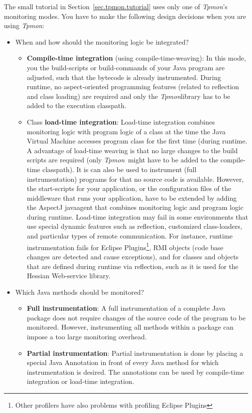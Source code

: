 \documentclass[a4paper,12pt]{scrartcl}
\newcommand{\tpmon}{\textit{Tpmon}}
\begin{document}
The small tutorial in Section~\ref{sec.tpmon.tutorial} uses only one of \tpmon's monitoring modes. You have to make the following design decisions when you are using \tpmon:
\begin{itemize}
 \item When and how should the monitoring logic be integrated?
\begin{itemize}
 \item \textbf{Compile-time integration} (using compile-time-weaving): In this mode, you the build-scripts or build-commands of your Java program are adjusted, such that the bytecode is already instrumented. During runtime, no aspect-oriented programming features (related to reflection and class loading) are required and only the \tpmon library has to be added to the execution classpath.
\item Class \textbf{load-time integration}: Load-time integration combines monitoring logic with program logic of a class at the time the Java Virtual Machine accesses program class for the first time (during runtime. A advantage of load-time weaving is that no large changes to the build scripts are required (only \tpmon\ might have to be added to the compile-time classpath). It is can also be used to instrument (full instrumentation) programs for that no source code is available. However, the start-scripts for your application, or the configuration files of the middleware that runs your application, have to be extended by adding the AspectJ javaagent that combines monitoring logic and program logic during runtime. Load-time integration may fail in some environments that use special dynamic features such as reflection, customized class-loaders, and particular types of remote communication. For instance, runtime instrumentation fails for Eclipse Plugins\footnote{Other profilers have also problems with profiling Eclipse Plugins}, RMI objects (code base changes are detected and cause exceptions), and for classes and objects that are defined during runtime via reflection, such as it is used for the Hessian Web-service library.
\end{itemize}
\item Which Java methods should be monitored?
\begin{itemize}
\item \textbf{Full instrumentation}: A full instrumentation of a complete Java package does not require changes of the source code of the program to be monitored. However, instrumenting all methods within a package can impose a too large monitoring overhead. 
\item \textbf{Partial instrumentation}: Partial instrumentation is done by placing a special Java Annotation in front of every Java method for which instrumentation is desired. The annotations can be used by compile-time integration or load-time integration. 

\end{itemize}
\end{itemize}
\end{document}
